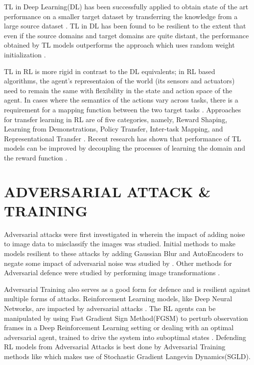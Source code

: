 TL in Deep Learning(DL) has been successfully applied to obtain state
of the art performance on a smaller target dataset by transferring the
knowledge from a large source dataset \cite{TLDLBasic}. TL in DL has
been found to be resilient to the extent that even if the source
domains and target domains are quite distant, the performance obtained
by TL models outperforms the approach which uses random weight
initialization \cite{TLDLPower}.

TL in RL is more rigid in contrast to the DL equivalents; in RL based
algorithms, the agent's representaion of the world (its sensors and
actuators) need to remain the same with flexibility in the state and
action space of the agent. In cases where the semantics of the actions
vary across tasks, there is a requirement for a mapping function
between the two target tasks \cite{TLRLImplement}. Approaches for
transfer learning in RL are of five categories, namely, Reward
Shaping, Learning from Demonstrations, Policy Transfer, Inter-task
Mapping, and Representational Transfer \cite{tl-rl-survey}. Recent
research has shown that performance of TL models can be improved by
decoupling the processes of learning the domain and the reward
function \cite{tl-decoupling}.

\section{ADVERSARIAL ATTACK \& TRAINING} \label{lit-at}
%
Adversarial attacks were first investigated in \cite{ad-intro} wherein
the impact of adding noise to image data to misclassify the images was
studied. Initial methods to make models resilient to these attacks by
adding Gaussian Blur and AutoEncoders to negate some impact of
adversarial noise was studied by \cite{adreco1}. Other methods for
Adversarial defence were studied by performing image transformations
\cite{adreco2}.

Adversarial Training \cite{AT-Ian} also serves as a good form for
defence and is resilient against multiple forms of
attacks. Reinforcement Learning models, like Deep Neural Networks, are
impacted by adversarial attacks \cite{rlad1}. The RL agents can be
manipulated by using Fast Gradient Sign Method(FGSM) \cite{rl-fgsm} to
perturb observation frames in a Deep Reinforcement Learning setting or
dealing with an optimal adversarial agent, trained to drive the system
into suboptimal states \cite{rlad2}. Defending RL models from
Adversarial Attacks is best done by Adversarial Training methods like
\cite{rlat1} which makes use of Stochastic Gradient Langevin
Dynamics(SGLD).

